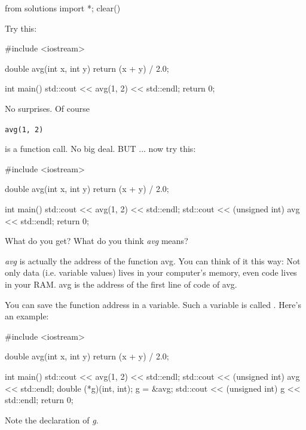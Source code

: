 \begin{python0}
from solutions import *; clear()
\end{python0}

Try this:

\begin{consolethree}[escapeinside=||]
#include <iostream>

double avg(int x, int y)
{
    return (x + y) / 2.0;
}

int main()
{
    std::cout << avg(1, 2) << std::endl;
    return 0;
}
\end{consolethree}

No surprises. Of course

\verb!avg(1, 2)!

is a function call. No big deal. BUT ... now try this:

\begin{consolethree}[escapeinside=||]
#include <iostream>

double avg(int x, int y)
{
    return (x + y) / 2.0;
}

int main()
{
    std::cout << avg(1, 2) << std::endl;
    std::cout << (unsigned int) avg << std::endl;
    return 0;
}
\end{consolethree}

What do you get? What do you think \textit{avg} means?

\textit{avg} is actually the address of the function avg. You can think of
it this way: Not only data (i.e. variable values) lives in your
computer's memory, even code lives in your RAM. avg is
the address of the first line of code of avg.

You can save the function address in a variable. Such a variable is
called . Here's an example:

\begin{consolethree}[escapeinside=||]
#include <iostream>

double avg(int x, int y)
{
    return (x + y) / 2.0;
}

int main()
{
    std::cout << avg(1, 2) << std::endl;
    std::cout << (unsigned int) avg << std::endl;
    double (*g)(int, int);
    g = &avg;
    std::cout << (unsigned int) g << std::endl;
    return 0;
}
\end{consolethree}

Note the declaration of \textit{g}.




